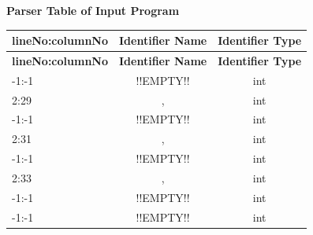 \documentclass{article}
\begin{document}
\begin{center}
    {\LARGE \textbf{Parser Table of Input Program}} \\[10pt]
\end{center}

\renewcommand{\arraystretch}{1.3}
\setlength{\arrayrulewidth}{0.7mm}
\begin{longtable}{|l|c|c|}
    \hline
    \rowcolor{headercolor} \textbf{lineNo:columnNo} & \textbf{Identifier Name} & \textbf{Identifier Type} \\ 
    \hline
    \endfirsthead
    \hline
    \rowcolor{headercolor} \textbf{lineNo:columnNo} & \textbf{Identifier Name} & \textbf{Identifier Type} \\ 
    \hline
    \endhead
    -1:-1 & !!EMPTY!! & int \\ 
    \hline
    2:29 & , & int \\ 
    \hline
    -1:-1 & !!EMPTY!! & int \\ 
    \hline
    2:31 & , & int \\ 
    \hline
    -1:-1 & !!EMPTY!! & int \\ 
    \hline
    2:33 & , & int \\ 
    \hline
    -1:-1 & !!EMPTY!! & int \\ 
    \hline
    -1:-1 & !!EMPTY!! & int \\ 
    \hline
\end{longtable}
\end{document}
